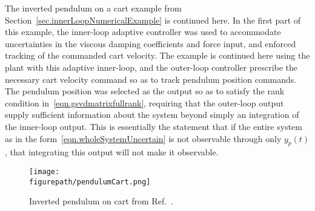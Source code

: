 The inverted pendulum on a cart example from Section~\ref{sec.innerLoopNumericalExample} is continued here.
In the first part of this example, the inner-loop adaptive controller was used to accommodate uncertainties in the viscous damping coefficients and force input, and enforced tracking of the commanded cart velocity.
The example is continued here using the plant with this adaptive inner-loop, and the outer-loop controller prescribe the necessary cart velocity command so as to track pendulum position commands.
The pendulum position was selected as the output so as to satisfy the rank condition in\ \eqref{eqn.gsvdmatrixfullrank}, requiring that the outer-loop output supply sufficient information about the system beyond simply an integration of the inner-loop output.
This is essentially the statement that if the entire system as in the form\ \eqref{eqn.wholeSystemUncertain} is not observable through only $y_{p}(t)$, that integrating this output will not make it observable.

\begin{figure}[H]
  \begin{center}
    \texttt{[image: \\figurepath/pendulumCart.png]}
    \vspace{-0.1in}
    \caption{Inverted pendulum on cart from Ref.\ \cite{astrom.feedbackintro.2010}.\label{fig.pendulumCart}}
  \end{center}
\end{figure}

